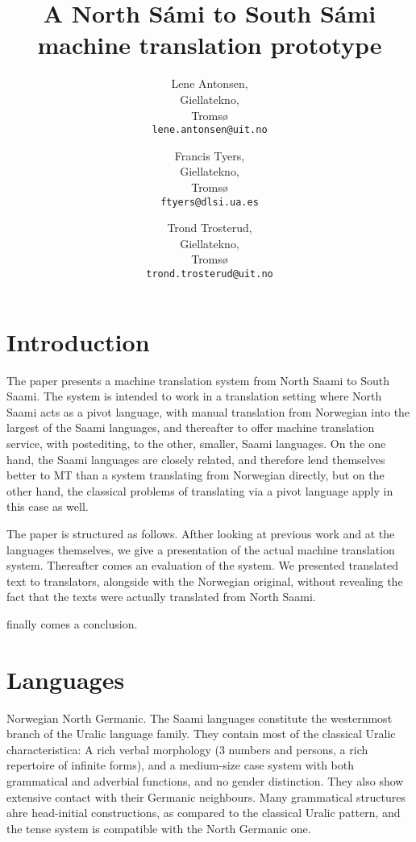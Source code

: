 \documentclass[a4paper,11pt,twocolumn]{article}
\title{A North Sámi to South Sámi machine translation prototype}
\author{Lene Antonsen,\\Giellatekno,\\Tromsø\\{\tt lene.antonsen@uit.no}
\and Francis Tyers,\\Giellatekno,\\Tromsø\\{\tt ftyers@dlsi.ua.es}
\and Trond Trosterud,\\Giellatekno,\\Tromsø\\{\tt trond.trosterud@uit.no}}
\date{}
\begin{document}
\maketitle

\section{Introduction}

The paper presents a machine translation system from North Saami to
South Saami. The system is intended to work in a translation setting
where North Saami acts as a pivot language, with manual translation
from Norwegian into the largest of the Saami languages, and thereafter
to offer machine translation service, with postediting, to the other,
smaller, Saami languages. On the one hand, the Saami languages are
closely related, and therefore lend themselves better to MT than a
system translating from Norwegian directly, but on the other hand, the
classical problems of translating via a pivot language apply in this
case as well. 

The paper is structured as follows. Afther looking at previous work
and at the languages themselves, we give a presentation of the actual
machine translation system. Thereafter comes an evaluation of the
system. We presented translated text to translators, alongside with
the Norwegian original, without revealing the fact that the texts were
actually translated from North Saami.

finally comes a conclusion.


\cite{tyers09} \cite{wiechetek10} \cite{trosterud12}


\section{Languages}

Norwegian North Germanic. The Saami languages constitute the
westernmost branch of the Uralic language family. They contain most of
the classical Uralic characteristica: A rich verbal morphology (3
numbers and persons, a rich repertoire of infinite forms), and a
medium-size case system with both grammatical and adverbial functions,
and no gender distinction. They also show extensive contact with their
Germanic neighbours. Many grammatical structures ahre head-initial
constructions, as compared to the classical Uralic pattern, and the
tense system is compatible with the North Germanic one.
\end{document}
